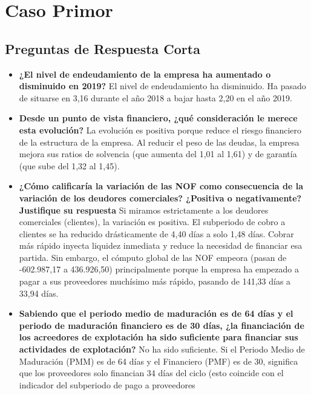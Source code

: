 \documentclass[12pt]{book} %
\begin{document}
\hypertarget{caso-primor}{%
\chapter{Caso Primor}\label{caso-primor}}

\hypertarget{preguntas-de-respuesta-corta}{%
\section{\texorpdfstring{\textbf{Preguntas de Respuesta
Corta}}{Preguntas de Respuesta Corta}}\label{preguntas-de-respuesta-corta}}

\begin{itemize}
\item
  \textbf{¿El nivel de endeudamiento de la empresa ha aumentado o
  disminuido en 2019?} El nivel de endeudamiento ha disminuido. Ha
  pasado de situarse en 3,16 durante el año 2018 a bajar hasta 2,20 en
  el año 2019.
\item
  \textbf{Desde un punto de vista financiero, ¿qué consideración le
  merece esta evolución?} La evolución es positiva porque reduce el
  riesgo financiero de la estructura de la empresa. Al reducir el peso
  de las deudas, la empresa mejora sus ratios de solvencia (que aumenta
  del 1,01 al 1,61) y de garantía (que sube del 1,32 al 1,45).
\item
  \textbf{¿Cómo calificaría la variación de las NOF como consecuencia de
  la variación de los deudores comerciales? ¿Positiva o negativamente?
  Justifique su respuesta} Si miramos estrictamente a los deudores
  comerciales (clientes), la variación es positiva. El subperiodo de
  cobro a clientes se ha reducido drásticamente de 4,40 días a solo 1,48
  días. Cobrar más rápido inyecta liquidez inmediata y reduce la
  necesidad de financiar esa partida. Sin embargo, el cómputo global de
  las NOF empeora (pasan de -602.987,17 a 436.926,50) principalmente
  porque la empresa ha empezado a pagar a sus proveedores muchísimo más
  rápido, pasando de 141,33 días a 33,94 días.
\item
  \textbf{Sabiendo que el periodo medio de maduración es de 64 días y el
  periodo de maduración financiero es de 30 días, ¿la financiación de
  los acreedores de explotación ha sido suficiente para financiar sus
  actividades de explotación?} No ha sido suficiente. Si el Periodo
  Medio de Maduración (PMM) es de 64 días y el Financiero (PMF) es de
  30, significa que los proveedores solo financian 34 días del ciclo
  (esto coincide con el indicador del subperiodo de pago a proveedores

\end{itemize}
\end{document}
